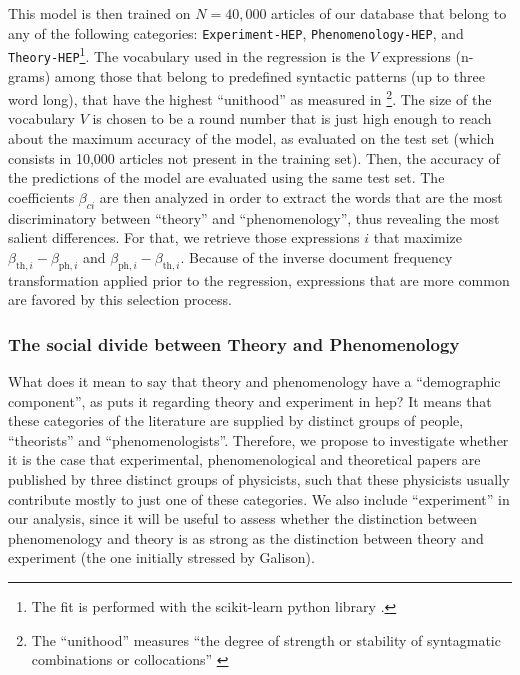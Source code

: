 \documentclass[smallextended]{svjour3}
\begin{document}
This model is then trained on $N=40,000$ articles of our database that belong to any of the following categories: \texttt{Experiment-HEP}, \texttt{Phenomenology-HEP}, and \texttt{Theory-HEP}\footnote{The fit is performed with the scikit-learn python library \citep{scikit-learn}.}. The vocabulary used in the regression is the $V$ expressions (n-grams) among those that belong to predefined syntactic patterns (up to three word long), that have the highest ``unithood'' as measured in \citealt{omodei_tel-01097702}\footnote{The ``unithood'' measures ``the degree of strength or stability of syntagmatic combinations or collocations'' \citep{Kageura1996}}. The size of the vocabulary $V$ is chosen to be a round number that is just high enough to reach about the maximum accuracy of the model, as evaluated on the test set (which consists in 10,000 articles not present in the training set). Then, the accuracy of the predictions of the model are evaluated using the same test set. The coefficients $\beta_{ci}$ are then analyzed in order to extract the words that are the most discriminatory between ``theory'' and ``phenomenology'', thus revealing the most salient differences. For that, we retrieve those expressions $i$ that maximize $\beta_{\text{th},i}-\beta_{\text{ph},i}$ and $\beta_{\text{ph},i}-\beta_{\text{th},i}$. Because of the inverse document frequency transformation applied prior to the regression, expressions that are more common are favored by this selection process.

\subsubsection{The social divide between Theory and Phenomenology}

What does it mean to say that theory and phenomenology have a ``demographic component'', as  \citet[p.~138]{galison1987how} puts it regarding theory and experiment in \gls{hep}? It means that these categories of the literature are supplied by distinct groups of people, ``theorists'' and ``phenomenologists''. Therefore, we propose to investigate whether it is the case that experimental, phenomenological and theoretical papers are published by three distinct groups of physicists, such that these physicists usually contribute mostly to just one of these categories. We also include ``experiment'' in our analysis, since it will be useful to assess whether the distinction between phenomenology and theory is as strong as the distinction between theory and experiment (the one initially stressed by Galison).
\end{document}
